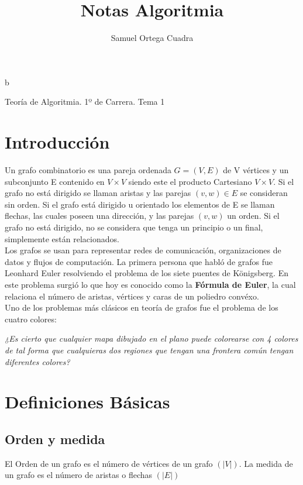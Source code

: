 b\documentclass[11pt]{article}
\title{Notas Algoritmia}
\author{Samuel Ortega Cuadra}
\theoremstyle{plain}
\begin{document}
    \begin{center}
        \huge{Teoría de Algoritmia. 1º de Carrera. Tema 1}
    \end{center}
    \tableofcontents
    \newpage
    \section{Introducción} %
    \label{sec:introducción}
        Un grafo combinatorio es una pareja ordenada $G = (V,E)$ de V vértices y un subconjunto E contenido en $V \times V$ siendo este el producto Cartesiano $V \times V$. Si el grafo no está dirigido se llaman aristas y las parejas $(v,w) \in E$ se consideran sin orden. Si el grafo está dirigido u orientado los elementos de E se llaman flechas, las cuales poseen una dirección, y las parejas $(v,w)$ un orden. Si el grafo no está dirigido, no se considera que tenga un principio o un final, simplemente están relacionados.\\

        Los grafos se usan para representar redes de comunicación, organizaciones de datos y flujos de computación. La primera persona que habló de grafos fue Leonhard Euler resolviendo el problema de los siete puentes de Königsberg. En este problema surgió lo que hoy es conocido como la \textbf{Fórmula de Euler}, la cual relaciona el número de aristas, vértices y caras de un poliedro convéxo.\\

        Uno de los problemas más clásicos en teoría de grafos fue el problema de los cuatro colores:

        \begin{center}
            \textit{¿Es cierto que cualquier mapa dibujado en el plano puede colorearse con 4 colores de tal forma que cualquieras dos regiones que tengan una frontera común tengan diferentes colores?}
        \end{center}
    \section{Definiciones Básicas} %
    \label{sec:definiciones_básicas}
        \subsection{Orden y medida} %
        \label{sub:orden_y_medida}
            El Orden de un grafo es el número de vértices de un grafo $(|V|)$. La medida de un grafo es el número de aristas o flechas $(|E|)$
\end{document}
